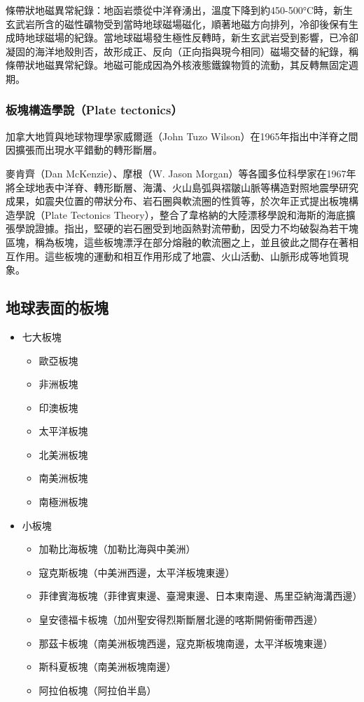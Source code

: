 \documentclass[a4paper,12pt]{report}
\begin{document}
條帶狀地磁異常紀錄：地函岩漿從中洋脊湧出，溫度下降到約450-500°C時，新生玄武岩所含的磁性礦物受到當時地球磁場磁化，順著地磁方向排列，冷卻後保有生成時地球磁場的紀錄。當地球磁場發生極性反轉時，新生玄武岩受到影響，已冷卻凝固的海洋地殼則否，故形成正、反向（正向指與現今相同）磁場交替的紀錄，稱條帶狀地磁異常紀錄。地磁可能成因為外核液態鐵鎳物質的流動，其反轉無固定週期。
\subsubsection{板塊構造學說（Plate tectonics）}
加拿大地質與地球物理學家威爾遜（John Tuzo Wilson）在1965年指出中洋脊之間因擴張而出現水平錯動的轉形斷層。

麥肯齊（Dan McKenzie）、摩根（W. Jason Morgan）等各國多位科學家在1967年將全球地表中洋脊、轉形斷層、海溝、火山島弧與褶皺山脈等構造對照地震學研究成果，如震央位置的帶狀分布、岩石圈與軟流圈的性質等，於次年正式提出板塊構造學說（Plate Tectonics Theory），整合了韋格納的大陸漂移學說和海斯的海底擴張學說證據。指出，堅硬的岩石圈受到地函熱對流帶動，因受力不均破裂為若干塊區塊，稱為板塊，這些板塊漂浮在部分熔融的軟流圈之上，並且彼此之間存在著相互作用。這些板塊的運動和相互作用形成了地震、火山活動、山脈形成等地質現象。
\subsection{地球表面的板塊}
\bct\bfH\ctr{}\caption{Eric Gaba, 2006, updated 2015}\ef\FB\ect
\begin{itemize}
\item 七大板塊
\begin{itemize}
\item 歐亞板塊
\item 非洲板塊
\item 印澳板塊
\item 太平洋板塊
\item 北美洲板塊
\item 南美洲板塊
\item 南極洲板塊
\end{itemize}
\item 小板塊
\begin{itemize}
\item 加勒比海板塊（加勒比海與中美洲）
\item 寇克斯板塊（中美洲西邊，太平洋板塊東邊）
\item 菲律賓海板塊（菲律賓東邊、臺灣東邊、日本東南邊、馬里亞納海溝西邊）
\item 皇安德福卡板塊（加州聖安得烈斯斷層北邊的喀斯開俯衝帶西邊）
\item 那茲卡板塊（南美洲板塊西邊，寇克斯板塊南邊，太平洋板塊東邊）
\item 斯科夏板塊（南美洲板塊南邊）
\item 阿拉伯板塊（阿拉伯半島）
\end{itemize}
\end{itemize}
\end{document}
